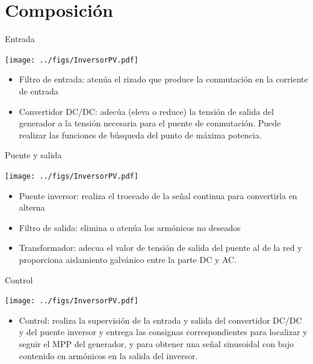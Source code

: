 \documentclass[aspectratio=169, usenames,svgnames,dvipsnames]{beamer}
\begin{document}
\section{Composición}
\label{sec:orgac31ce9}
\begin{frame}[label={sec:org43f70be}]{Entrada}
\begin{center}
\texttt{[image: ../figs/InversorPV.pdf]}
\end{center}

\begin{itemize}
\item \alert{Filtro de entrada}: atenúa el rizado que produce la conmutación en
la corriente de entrada

\item \alert{Convertidor DC/DC}: adecúa (eleva o reduce) la tensión de salida del
generador a la tensión necesaria para el puente de conmutación. Puede
realizar las funciones de búsqueda del punto de máxima potencia.
\end{itemize}
\end{frame}

\begin{frame}[label={sec:org9651f9f}]{Puente y salida}
\begin{center}
\texttt{[image: ../figs/InversorPV.pdf]}
\end{center}

\begin{itemize}
\item \alert{Puente inversor}: realiza el troceado de la señal continua para
convertirla en alterna

\item \alert{Filtro de salida}: elimina o atenúa los armónicos no deseados

\item \alert{Transformador}: adecua el valor de tensión de salida del puente al
de la red y proporciona aislamiento galvánico entre la parte DC y
AC.
\end{itemize}
\end{frame}

\begin{frame}[label={sec:org54580f6}]{Control}
\begin{center}
\texttt{[image: ../figs/InversorPV.pdf]}
\end{center}

\begin{itemize}
\item \alert{Control}: realiza la supervisión de la entrada y salida del
convertidor DC/DC y del puente inversor y entrega las consignas
correspondientes para localizar y seguir el MPP del generador, y para
obtener una señal sinusoidal con bajo contenido en armónicos en la
salida del inversor.
\end{itemize}
\end{frame}
\end{document}
